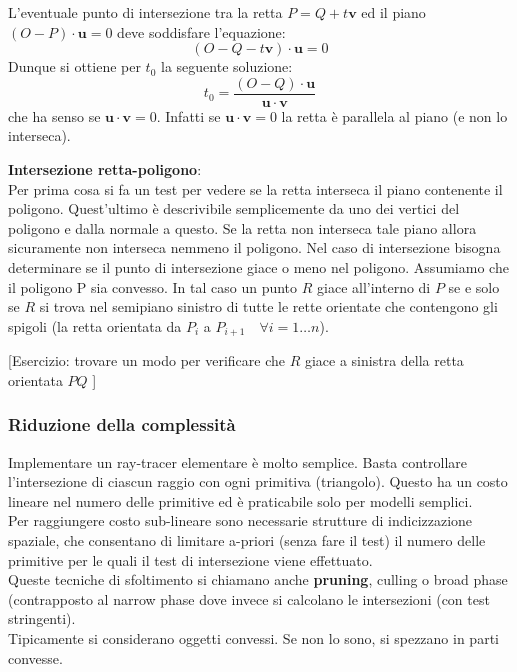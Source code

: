 \documentclass[a4paper, 10pt]{article}
\renewcommand{\vec}{\bm}
\begin{document}
		\bigskip
		
		L’eventuale punto di intersezione tra la retta $ P = Q + t\vec{v} $ ed il
		piano $ (O - P ) \cdot\vec{u} = 0 $ deve soddisfare l’equazione:
		\[
			(O - Q - t\vec{v}) \cdot\vec{u} = 0
		\]
		Dunque si ottiene per $ t_0 $ la seguente soluzione:
		\[
			t_0 = \dfrac{(O - Q) \cdot\vec{u}}{\vec{u}\cdot\vec{v}}
		\]
		che ha senso se $ \vec{u}\cdot\vec{v} = 0 $. Infatti se $ \vec{u}\cdot\vec{v} = 0 $ la retta è parallela al piano (e non lo interseca).
		
		\textbf{Intersezione retta-poligono}:\\
		Per prima cosa si fa un test per vedere se la retta interseca il piano contenente il poligono.
		Quest’ultimo è descrivibile semplicemente da uno dei vertici del poligono e dalla normale a questo. Se la retta non interseca tale piano allora sicuramente non
		interseca nemmeno il poligono. Nel caso di intersezione bisogna determinare se il punto di
		intersezione giace o meno nel poligono. Assumiamo che il poligono P sia convesso. In tal caso un punto $ R $ giace all’interno di $ P $ se e solo se $ R $ si trova nel semipiano
		sinistro di tutte le rette orientate che contengono gli spigoli
		(la retta orientata da $ P_i $ a $ P_{i+1} \quad \forall i = 1 \dots n  $).
		
		[Esercizio: trovare un modo per verificare che $ R $ giace a sinistra della
		retta orientata $ P Q $ ]
		
	\subsubsection{Riduzione della complessità}	
		Implementare un ray-tracer elementare è molto semplice. Basta controllare l’intersezione di ciascun raggio con ogni primitiva (triangolo). Questo ha un costo lineare nel numero delle
		primitive ed è praticabile solo per modelli semplici.\\
		Per raggiungere costo sub-lineare sono necessarie strutture di indicizzazione spaziale, che consentano di limitare a-priori (senza fare il test) il numero delle primitive per le quali il
		test di intersezione viene effettuato.\\
		Queste tecniche di sfoltimento si chiamano anche \textbf{pruning}, culling o broad phase (contrapposto al narrow phase dove invece si calcolano le intersezioni (con test stringenti).\\
		Tipicamente si considerano oggetti convessi. Se non lo sono, si spezzano in parti convesse.
		
\end{document}
